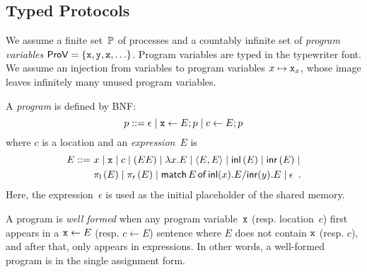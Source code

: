 \subsection{Typed Protocols}

We assume a finite set~$\mathbb{P}$
of processes and a countably infinite
set of \textit{program variables}
$\mathsf{ProV} =\{\texttt{x}, \texttt{y}, \texttt{z}, \ldots\}$.
Program variables are typed in the typewriter font.
We assume an injection from variables to program variables $x\mapsto
\texttt{x}_x$, whose image leaves infinitely many unused program variables.

A \textit{program} is defined by BNF:
\[
 p ::= \epsilon\mid
 \texttt{x}\leftarrow E; p \mid
 c \leftarrow E; p
\]
where $c$ is a location and an \textit{expression}~$E$ is
\begin{align*}
 E
 ::=\,\,
 &x\mid \texttt{x} \mid c \mid (EE)\mid \lambda
 x.E\mid \langle{E,E}\rangle\mid \mathsf{inl}\left({E}\right)\mid \mathsf{inr}\left({E}\right)\mid \\
 &\pi_{\mathsf l}\left({E}\right)\mid\pi_{\mathsf r}\left({E}\right)\mid  \mathsf{match}\,{E}\,\mathsf{of}\, \mathsf{inl}({x}). {E}/ \mathsf{inr}({y}). {E}\mid \epsilon\enspace.
\end{align*}
Here, the expression~$\epsilon$ is used as the initial placeholder of the shared
memory.

\newcommand{\Wg}{W_{\mathrm g}}
\newcommand{\Wd}{W_{\mathrm d}}
A program is \textit{well formed} when
any program variable~$\texttt{x}$ (resp. location~$c$) first appears in a $\texttt{x}\leftarrow E$
(resp. $c\leftarrow E$)
sentence where $E$ does not contain $\texttt{x}$ (resp. $c$), and
after that, only appears in expressions.
In other words, a well-formed program is in the single assignment form.


